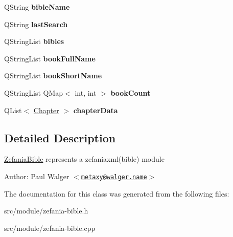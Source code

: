 \begin{CompactItemize}
\item 
\hypertarget{classZefaniaBible_cb6873f8f693fc27280838709193252d}{
QString \textbf{bibleName}}
\label{classZefaniaBible_cb6873f8f693fc27280838709193252d}

\item 
\hypertarget{classZefaniaBible_47945ce9294970ef70e9524fd1957b81}{
QString \textbf{lastSearch}}
\label{classZefaniaBible_47945ce9294970ef70e9524fd1957b81}

\item 
\hypertarget{classZefaniaBible_c24235f3b32dfc2f6fe2e070b0d2519e}{
QStringList \textbf{bibles}}
\label{classZefaniaBible_c24235f3b32dfc2f6fe2e070b0d2519e}

\item 
\hypertarget{classZefaniaBible_94c2f571ecb0df013416a3af760b4ce1}{
QStringList \textbf{bookFullName}}
\label{classZefaniaBible_94c2f571ecb0df013416a3af760b4ce1}

\item 
\hypertarget{classZefaniaBible_7d6ae96fa377120f6cc0ce3db66fb454}{
QStringList \textbf{bookShortName}}
\label{classZefaniaBible_7d6ae96fa377120f6cc0ce3db66fb454}

\item 
\hypertarget{classZefaniaBible_411d4aef5506b8c770e9e329db9bcf45}{
QStringList QMap$<$ int, int $>$ \textbf{bookCount}}
\label{classZefaniaBible_411d4aef5506b8c770e9e329db9bcf45}

\item 
\hypertarget{classZefaniaBible_248fea01d2a43b23c2b7df54cd2bfcf7}{
QList$<$ \hyperlink{structChapter}{Chapter} $>$ \textbf{chapterData}}
\label{classZefaniaBible_248fea01d2a43b23c2b7df54cd2bfcf7}

\end{CompactItemize}


\subsection{Detailed Description}
\hyperlink{classZefaniaBible}{ZefaniaBible} represents a zefaniaxml(bible) module

\begin{Desc}
\item[Author:]Paul Walger $<$\href{mailto:metaxy@walger.name}{\tt metaxy@walger.name}$>$ \end{Desc}


The documentation for this class was generated from the following files:\begin{CompactItemize}
\item 
src/module/zefania-bible.h\item 
src/module/zefania-bible.cpp\end{CompactItemize}
